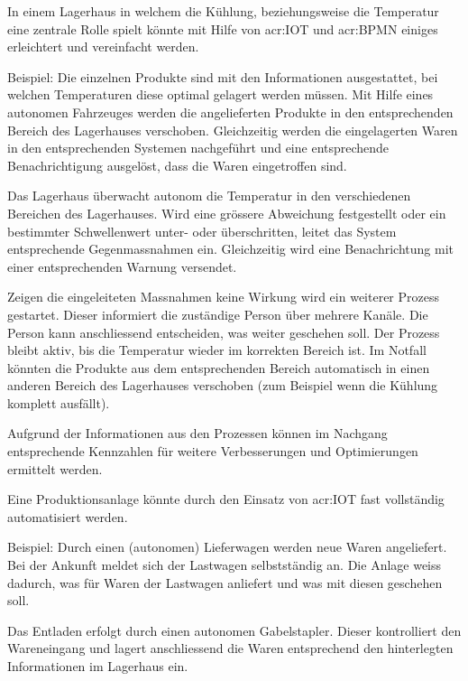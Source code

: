 \begin{itemize}
{In einem Lagerhaus in welchem die Kühlung, beziehungsweise die Temperatur eine zentrale Rolle spielt könnte mit Hilfe von \gls{acr:IOT} und \gls{acr:BPMN} einiges erleichtert und vereinfacht werden. 

Beispiel: Die einzelnen Produkte sind mit den Informationen ausgestattet, bei welchen Temperaturen diese optimal gelagert werden müssen. Mit Hilfe eines autonomen Fahrzeuges werden die angelieferten Produkte in den entsprechenden Bereich des Lagerhauses verschoben. Gleichzeitig werden die eingelagerten Waren in den entsprechenden Systemen nachgeführt und eine entsprechende Benachrichtigung ausgelöst, dass die Waren eingetroffen sind.

Das Lagerhaus überwacht autonom die Temperatur in den verschiedenen Bereichen des Lagerhauses. Wird eine grössere Abweichung festgestellt oder ein bestimmter Schwellenwert unter- oder überschritten, leitet das System entsprechende Gegenmassnahmen ein. Gleichzeitig wird eine Benachrichtung mit einer entsprechenden Warnung versendet.

Zeigen die eingeleiteten Massnahmen keine Wirkung wird ein weiterer Prozess gestartet. Dieser informiert die zuständige Person über mehrere Kanäle. Die Person kann anschliessend entscheiden, was weiter geschehen soll. Der Prozess bleibt aktiv, bis die Temperatur wieder im korrekten Bereich ist. Im Notfall könnten die Produkte aus dem entsprechenden Bereich automatisch in einen anderen Bereich des Lagerhauses verschoben (zum Beispiel wenn die Kühlung komplett ausfällt). 

Aufgrund der Informationen aus den Prozessen können im Nachgang entsprechende Kennzahlen für weitere Verbesserungen und Optimierungen ermittelt werden.}


{Eine Produktionsanlage könnte durch den Einsatz von \gls{acr:IOT} fast vollständig automatisiert werden.

Beispiel: Durch einen (autonomen) Lieferwagen werden neue Waren angeliefert. Bei der Ankunft meldet sich der Lastwagen selbstständig an. Die Anlage weiss dadurch, was für Waren der Lastwagen anliefert und was mit diesen geschehen soll. 

Das Entladen erfolgt durch einen autonomen Gabelstapler. Dieser kontrolliert den Wareneingang und lagert anschliessend die Waren entsprechend den hinterlegten Informationen im Lagerhaus ein.

}
\end{itemize}
